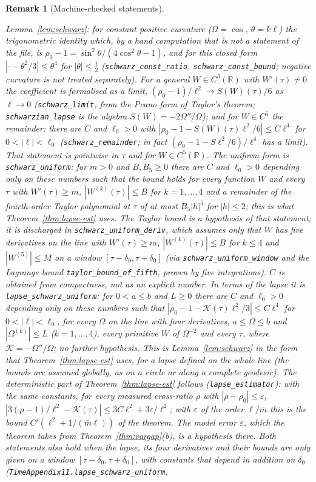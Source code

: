 \documentclass[11pt,a4paper]{article}
\theoremstyle{stmt}
\theoremstyle{defn}
\theoremstyle{rmk}
\newtheorem{remark}[theorem]{Remark}
\numberwithin{equation}{section}
\newcommand{\R}{\mathbb{R}}
\begin{document}
{\begin{remark}[Machine-checked statements]
\begin{itemize}
\emph{Lemma~\ref{lem:schwarz}:} for constant positive curvature ($\Omega=\cos$, $\theta=k\ell$) the trigonometric identity which, by a hand computation that is not a statement of the file, is $\rho_0-1=\sin^2\theta/(4\cos^2\theta-1)$, and for this closed form $|\cdot-\theta^2/3|\le\theta^4$ for $|\theta|\le\frac12$ (\texttt{schwarz\_const\_ratio}, \texttt{schwarz\_const\_bound}; negative curvature is not treated separately). For a general $W\in C^3(\R)$ with $W'(\tau)\ne0$ the coefficient is formalised as a limit, $(\rho_0-1)/\ell^2\to S(W)(\tau)/6$ as $\ell\to0$ (\texttt{schwarz\_limit}, from the Peano form of Taylor's theorem; \texttt{schwarzian\_lapse} is the algebra $S(W)=-2\Omega''/\Omega$); and for $W\in C^5$ the remainder: there are $C$ and $\ell_0>0$ with $|\rho_0-1-S(W)(\tau)\ell^2/6|\le C\ell^4$ for $0<|\ell|<\ell_0$ (\texttt{schwarz\_remainder}; in fact $(\rho_0-1-S\ell^2/6)/\ell^4$ has a limit). That statement is pointwise in $\tau$ and for $W\in C^5(\R)$. The uniform form is \texttt{schwarz\_uniform}: for $m>0$ and $B,B_5\ge0$ there are $C$ and $\ell_0>0$ depending only on these numbers such that the bound holds for every function $W$ and every $\tau$ with $W'(\tau)\ge m$, $|W^{(k)}(\tau)|\le B$ for $k=1,\dots,4$ and a remainder of the fourth-order Taylor polynomial at $\tau$ of at most $B_5|h|^5$ for $|h|\le2$; this is what Theorem~\ref{thm:lapse-est} uses. The Taylor bound is a hypothesis of that statement; it is discharged in \texttt{schwarz\_uniform\_deriv}, which assumes only that $W$ has five derivatives on the line with $W'(\tau)\ge m$, $|W^{(k)}(\tau)|\le B$ for $k\le4$ and $|W^{(5)}|\le M$ on a window $[\tau-\delta_0,\tau+\delta_0]$ (via \texttt{schwarz\_uniform\_window} and the Lagrange bound \texttt{taylor\_bound\_of\_fifth}, proven by five integrations). $C$ is obtained from compactness, not as an explicit number. In terms of the lapse it is \texttt{lapse\_schwarz\_uniform}: for $0<a\le b$ and $L\ge0$ there are $C$ and $\ell_0>0$ depending only on these numbers such that $|\rho_0-1-\mathcal K(\tau)\ell^2/3|\le C\ell^4$ for $0<|\ell|<\ell_0$, for every $\Omega$ on the line with four derivatives, $a\le\Omega\le b$ and $|\Omega^{(k)}|\le L$ ($k=1,\dots,4$), every primitive $W$ of $\Omega^{-2}$ and every $\tau$, where $\mathcal K=-\Omega''/\Omega$; no further hypothesis. This is Lemma~\ref{lem:schwarz} in the form that Theorem~\ref{thm:lapse-est} uses, for a lapse defined on the whole line (the bounds are assumed globally, as on a circle or along a complete geodesic). The deterministic part of Theorem~\ref{thm:lapse-est} follows (\texttt{lapse\_estimator}): with the same constants, for every measured cross-ratio $\rho$ with $|\rho-\rho_0|\le\varepsilon$, $|3(\rho-1)/\ell^2-\mathcal K(\tau)|\le3C\ell^2+3\varepsilon/\ell^2$; with $\varepsilon$ of the order $\ell/\bar m$ this is the bound $C'(\ell^2+1/(\bar m\ell))$ of the theorem. The model error $\varepsilon$, which the theorem takes from Theorem~\ref{thm:vargap}(b), is a hypothesis there. Both statements also hold when the lapse, its four derivatives and their bounds are only given on a window $[\tau-\delta_0,\tau+\delta_0]$, with constants that depend in addition on $\delta_0$ (\texttt{TimeAppendix11.lapse\_schwarz\_uniform}, 
\end{itemize}
\end{remark}}
\end{document}
